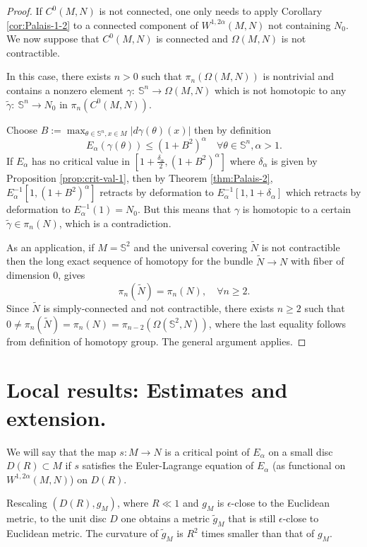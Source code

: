 \begin{proof}
If \(C^0(M,N)\) is not connected, one only needs to apply Corollary \ref{cor:Palais-1-2} to a
connected component of \(W^{1,2\alpha}(M,N)\) not containing \(N_0\). We now suppose
that \(C^0(M,N)\) is connected and \(\Omega(M,N)\) is not contractible.


In this case, there exists \(n>0\) such that \(\pi_n(\Omega(M,N))\) is nontrivial and
contains a nonzero element \(\gamma:\ \mathbb{S}^n \longrightarrow  \Omega(M,N)\)
which is not homotopic to any \(\tilde\gamma:\ \mathbb{S}^n \longrightarrow N_0\) in \(\pi_n(C^0(M,N))\).


Choose \(B:= \max_{\theta\in \mathbb{S}^n,x\in M} |d\gamma(\theta)(x)|\) then by
definition
\[
 E_\alpha(\gamma(\theta)) \leq (1+B^2)^\alpha\quad\forall \theta\in \mathbb{S}^n,\alpha>1.
\]
If \(E_\alpha\) has no critical value in \([1+\frac{\delta_\alpha}{2}, (1+B^2)^\alpha]\) where \(\delta_\alpha\) is given by Proposition \ref{prop:crit-val-1}, then by Theorem
\ref{thm:Palais-2}, \(E_\alpha^{-1}[1, (1+B^2)^\alpha]\) retracts by deformation to \(E_\alpha^{-1}[1, 1+\delta_\alpha]\) which retracts by deformation to \(E_\alpha^{-1}(1)=N_0\). But this means that \(\gamma\) is homotopic to a certain \(\tilde\gamma\in \pi_n(N)\), which is a contradiction.


As an application, if \(M= \mathbb{S}^2\) and the universal covering \(\tilde N\) is
not contractible then the long exact sequence of homotopy for the bundle \(\tilde N
\longrightarrow N\) with fiber of dimension \(0\), gives
\[
 \pi_n(\tilde N) = \pi_n(N),\quad \forall n\geq 2.
\]
Since \(\tilde N\) is simply-connected and not contractible, there exists \(n\geq 2\)
such that \(0\ne\pi_n(\tilde N) = \pi_n(N) = \pi_{n-2}(\Omega(\mathbb{S}^2,N))\), where
the last equality follows from definition of homotopy group. The
general argument applies.
\end{proof}


\section{Local results: Estimates and extension.}
\label{sec:org431f144}

We will say that the map \(s: M \longrightarrow N\) is a critical point of \(E_\alpha\) on a small disc \(D(R)\subset M\) if \(s\) satisfies the Euler-Lagrange equation of
\(E_\alpha\) (as functional on \(W^{1,2\alpha}(M,N)\)) on \(D(R)\).

\begin{remark}
\label{rem:rescal-Euclide}
Rescaling \((D(R), g_M)\), where \(R\ll 1\) and \(g_M\) is
\(\epsilon\)-close to the Euclidean metric, to the unit disc \(D\) one obtains a
metric \(\tilde g_M\) that is still \(\epsilon\)-close to Euclidean metric. The
curvature of \(\tilde g_M\) is \(R^2\) times smaller than that of \(g_M\).
\end{remark}

